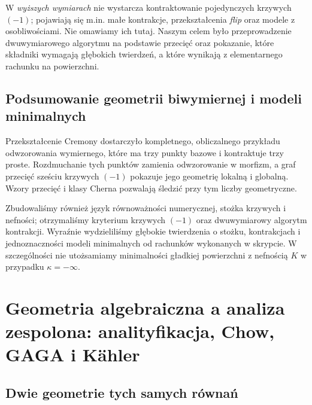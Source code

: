 \documentclass[11pt,a4paper,openany]{report}
\numberwithin{equation}{section}
\theoremstyle{plain}
\theoremstyle{definition}
\theoremstyle{remark}
\begin{document}
W \emph{wyższych wymiarach} nie wystarcza
kontraktowanie pojedynczych krzywych $(-1)$;
pojawiają się m.in. małe kontrakcje, przekształcenia
\emph{flip} oraz modele z osobliwościami.
Nie omawiamy ich tutaj. Naszym celem było
przeprowadzenie dwuwymiarowego algorytmu na
podstawie przecięć oraz pokazanie, które składniki
wymagają głębokich twierdzeń, a które wynikają
z elementarnego rachunku na powierzchni.



\section{Podsumowanie geometrii biwymiernej i modeli minimalnych}
\label{sec:ga8-conclusion}

Przekształcenie Cremony dostarczyło kompletnego,
obliczalnego przykładu odwzorowania wymiernego,
które ma trzy punkty bazowe i kontraktuje trzy proste.
Rozdmuchanie tych punktów zamienia odwzorowanie
w morfizm, a graf przecięć sześciu krzywych
$(-1)$ pokazuje jego geometrię lokalną i globalną.
Wzory przecięć i klasy Cherna pozwalają śledzić
przy tym liczby geometryczne.

Zbudowaliśmy również język równoważności numerycznej,
stożka krzywych i nefności; otrzymaliśmy kryterium
krzywych $(-1)$ oraz dwuwymiarowy algorytm kontrakcji.
Wyraźnie wydzieliliśmy głębokie twierdzenia o stożku,
kontrakcjach i jednoznaczności modeli minimalnych od
rachunków wykonanych w skrypcie. W szczególności
nie utożsamiamy minimalności gładkiej powierzchni
z nefnością $K$ w przypadku $\kappa=-\infty$.


\chapter{Geometria algebraiczna a analiza zespolona: analityfikacja, Chow, GAGA i Kähler}
\label{ch:ga9-analiza-zespolona}

\section{Dwie geometrie tych samych równań}
\label{sec:ga9-motywacja}
\end{document}
